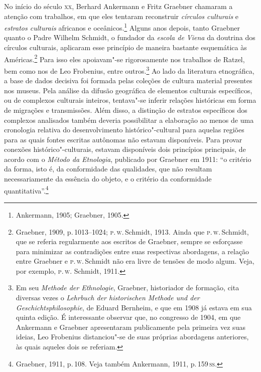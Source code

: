 No início do século \textsc{xx}, Berhard Ankermann e Fritz Graebner
chamaram a atenção com trabalhos, em que eles tentaram
reconstruir \textit{círculos culturais} e \textit{estratos culturais} africanos e
oceânicos.\footnote{Ankermann, 1905; Graebner, 1905.} Alguns anos
depois, tanto Graebner quanto o Padre Wilhelm Schmidt, o
fundador da \textit{escola de Viena} da doutrina dos círculos culturais,
aplicaram esse princípio de maneira bastante esquemática às
Américas.\footnote{Graebner, 1909, p.\,1013--1024; \textsc{p}.\,\textsc{w}.\,Schmidt, 1913.
  Ainda que \textsc{p}.\,\textsc{w}.\,Schmidt, que se referia regularmente aos escritos de
  Graebner, sempre se esforçasse para minimizar as contradições entre
  suas respectivas abordagens, a relação entre Graebner e \textsc{p}.\,\textsc{w}.\,Schmidt
  não era livre de tensões de modo algum. Veja, por exemplo, \textsc{p}.\,\textsc{w}. Schmidt, 1911.} Para isso eles apoiavam"-se rigorosamente nos trabalhos
de Ratzel, bem como nos de Leo Frobenius, entre
outros.\footnote{Em seu \textit{Methode der Ethnologie}, Graebner, historiador de formação, cita diversas vezes
  o \textit{Lehrbuch der historischen Methode und der
  Geschichtsphilosophie}, de Eduard Bernheim, e que em 1908 já estava em sua quinta
  edição. É interessante observar que, no congresso de 1904, em que
  Ankermann e Graebner apresentaram publicamente pela primeira vez suas
  ideias, Leo Frobenius distanciou"-se de suas próprias abordagens
  anteriores, às quais aqueles dois se referiam.} Ao lado da literatura
etnográfica, a base de dados decisiva foi formada pelas coleções de
cultura material presentes nos museus. Pela análise da difusão
geográfica de elementos culturais específicos, ou de complexos
culturais inteiros, tentava"-se inferir relações históricas em forma de
migrações e transmissões. Além disso, a distinção de estratos
específicos dos complexos analisados também deveria possibilitar a
elaboração ao menos de uma cronologia relativa do desenvolvimento
histórico"-cultural para aquelas regiões para as quais fontes escritas
autônomas não estavam disponíveis. Para provar conexões
histórico"-culturais, estavam disponíveis dois princípios principais, de
acordo com o \textit{Método da Etnologia},
publicado por Graebner em 1911: ``o critério da forma, isto é, da
conformidade das qualidades, que não resultam necessariamente da
essência do objeto, e o critério da conformidade quantitativa''.\footnote{Graebner, 1911, p.\,108. Veja também Ankermann, 1911, p.\,159\,\textsc{ss}.}

